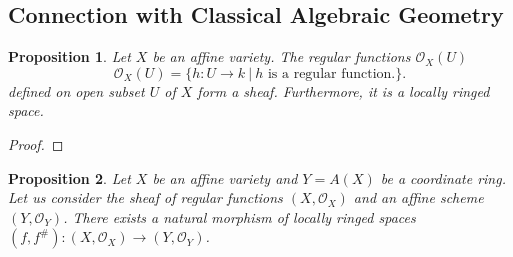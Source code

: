 \documentclass{article}
\newtheorem{proposition}{Proposition}[section]
\numberwithin{equation}{section}
\begin{document}
\subsection{Connection with Classical Algebraic Geometry}

\begin{proposition}
Let $X$ be an affine variety. The regular functions $\mathcal{O}_X(U)$ 
\begin{equation*}
\mathcal{O}_X(U) = \{h:U\to k\:|\: h\text{ is a regular function.}\}.
\end{equation*}
defined on open subset $U$ of $X$ form a sheaf. Furthermore, it is a locally ringed space.
\end{proposition}

\begin{proof}
\end{proof}

\begin{proposition}
Let $X$ be an affine variety and $Y=A(X)$ be a coordinate ring. Let us consider the sheaf of regular functions $(X,\mathcal{O}_X)$ and an affine scheme $(Y,\mathcal{O}_Y)$. There exists a natural morphism of locally ringed spaces $(f,f^{\#}):(X,\mathcal{O}_X)\to(Y,\mathcal{O}_Y)$.
\end{proposition}
\end{document}
